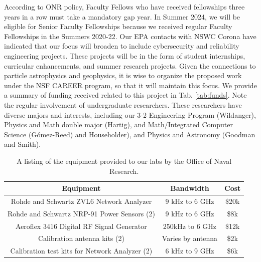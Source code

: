 \documentclass[../../main.tex]{subfiles}
\begin{document}
According to ONR policy, Faculty Fellows who have received fellowships three years in a row must take a mandatory gap year.  In Summer 2024, we will be eligible for Senior Faculty Fellowships because we received regular Faculty Fellowships in the Summers 2020-22.  Our EPA contacts with NSWC Corona have indicated that our focus will broaden to include cybersecurity and reliability engineering projects.  These projects will be in the form of student internships, curricular enhancements, and summer research projects.  Given the connections to particle astrophysics and geophysics, it is wise to organize the proposed work under the NSF CAREER program, so that it will maintain this focus.  We provide a summary of funding received related to this project in Tab. \ref{tab:funds}.  Note the regular involvement of undergraduate researchers.  These researchers have diverse majors and interests, including our 3-2 Engineering Program (Wildanger), Physics and Math double major (Hartig), and Math/Integrated Computer Science (G\'{o}mez-Reed) and Householder), and Physics and Astronomy (Goodman and Smith). \\ \vspace{2.5mm}

\begin{table}
\centering
\begin{tabular}{c c c}
Equipment & Bandwidth & Cost \\ \hline
Rohde and Schwartz ZVL6 Network Analyzer & 9 kHz to 6 GHz & \$20k \\
Rohde and Schwartz NRP-91 Power Sensors (2) & 9 kHz to 6 GHz & \$8k \\
Aeroflex 3416 Digital RF Signal Generator & 250kHz to 6 GHz & \$12k \\
Calibration antenna kits (2) & Varies by antenna & \$2k \\
Calibration test kits for Network Analyzer (2) & 6 kHz to 9 GHz & \$6k
\end{tabular}
\caption{\label{tab:equip} A listing of the equipment provided to our labs by the Office of Naval Research.}
\end{table}
\end{document}
